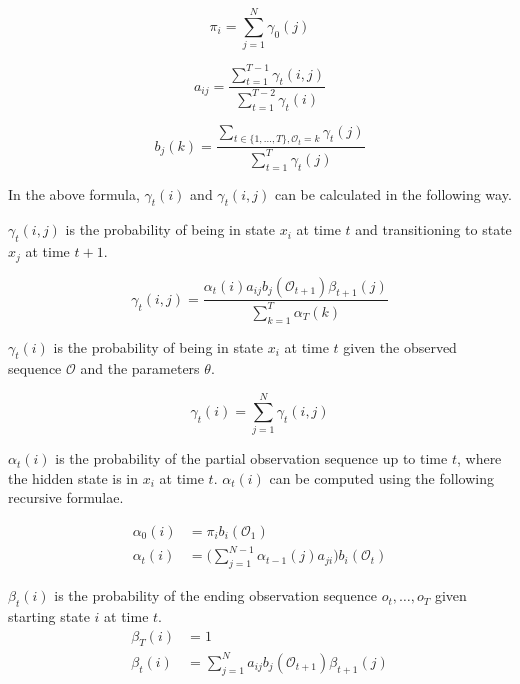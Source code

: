 \begin{equation*}
\pi_i = \sum\limits_{j=1}^{N} \gamma_0(j)
\end{equation*}

\begin{equation*}
a_{ij} = \frac{\sum\limits_{t=1}^{T-1} \gamma_t(i, j)}{ \sum\limits_{t=1}^{T-2} \gamma_t(i) }
\end{equation*}

\begin{equation*}
b_j(k) = \frac{ \sum\limits_{t \in \{1,\ldots, T\}, \mathcal{O}_t = k} \gamma_t(j) } { \sum\limits_{t=1}^{T} \gamma_t(j) }
\end{equation*}

In the above formula, $\gamma_t(i)$ and $\gamma_t(i, j)$ can be calculated in the following way.

$\gamma_t(i, j)$ is the probability of being in state $x_i$ at time $t$ and transitioning to state $x_j$ at time $t+1$.

\begin{equation*}
\gamma_t(i,j) = \frac { \alpha_t(i) a_{ij} b_j(\mathcal{O}_{t+1}) \beta_{t+1}(j) } { \sum\limits_{k=1}^{T} \alpha_{T}(k) }
\end{equation*}

$\gamma_t(i)$ is the probability of being in state $x_i$ at time $t$ given the observed sequence $\mathcal{O}$ and the parameters $\theta$.

\begin{equation*}
\gamma_t(i) = \sum\limits_{j=1}^{N} \gamma_t(i,j)
\end{equation*}

$\alpha_t(i)$ is the probability of the partial observation sequence up to time $t$, where the hidden state is in $x_i$ at time $t$. $\alpha_t(i)$ can be computed using the following recursive formulae.

\begin{align*}
\alpha_0(i) &= \pi_i b_i(\mathcal{O}_1) \\
\alpha_t(i) &= \Bigg( \sum\limits_{j=1}^{N-1} \alpha_{t-1}(j) a_{ji} \Bigg) b_i(\mathcal{O}_t)
\end{align*}

$\beta_t(i)$ is the probability of the ending observation sequence $o_t,\ldots,o_{T}$ given starting state $i$ at time $t$.
\begin{align*}
\beta_{T}(i) &= 1 \\
\beta_t(i) &= \sum\limits_{j=1}^{N} a_{ij} b_j(\mathcal{O}_{t+1}) \beta_{t+1}(j)
\end{align*}

